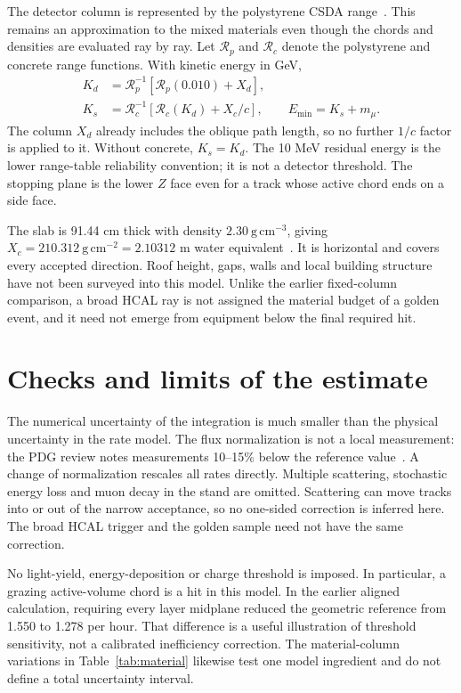 The detector column is represented by the polystyrene CSDA range~\cite{poly}.
This remains an approximation to the mixed materials even though the chords
and densities are evaluated ray by ray. Let $\mathcal R_p$ and
$\mathcal R_c$ denote the polystyrene and concrete range functions. With
kinetic energy in GeV,
\begin{align}
 K_d&=\mathcal R_p^{-1}[\mathcal R_p(0.010)+X_d],\\
 K_s&=\mathcal R_c^{-1}[\mathcal R_c(K_d)+X_c/c],\qquad
 E_{\min}=K_s+m_\mu .
\end{align}
The column $X_d$ already includes the oblique path length, so no further
$1/c$ factor is applied to it. Without concrete, $K_s=K_d$. The 10 MeV
residual energy is the lower range-table reliability convention; it is not
a detector threshold. The stopping plane is the lower $Z$ face even for a
track whose active chord ends on a side face.

The slab is 91.44 cm thick with density $2.30\ \mathrm{g\,cm^{-3}}$,
giving $X_c=210.312\ \mathrm{g\,cm^{-2}}=2.10312$ m water equivalent~\cite{concrete}.
It is horizontal and covers every accepted direction. Roof height, gaps,
walls and local building structure have not been surveyed into this model.
Unlike the earlier fixed-column comparison, a broad HCAL ray is not assigned
the material budget of a golden event, and it need not emerge from equipment
below the final required hit.

\section{Checks and limits of the estimate}
\label{sec:checks}




The numerical uncertainty of the integration is much smaller than the
physical uncertainty in the rate model. The flux normalization is not a local
measurement: the PDG review notes measurements 10--15\% below the reference
value~\cite{pdg}. A change of normalization rescales all rates directly.
Multiple scattering, stochastic energy loss and muon decay in the stand are
omitted. Scattering can move tracks into or out of the narrow acceptance,
so no one-sided correction is inferred here. The broad HCAL trigger and
the golden sample need not have the same correction.

No light-yield, energy-deposition or charge threshold is imposed. In particular,
a grazing active-volume chord is a hit in this model. In the earlier aligned
calculation, requiring every layer midplane reduced the geometric reference
from 1.550 to 1.278 per hour. That difference is a useful illustration of
threshold sensitivity, not a calibrated inefficiency correction. The
material-column variations in Table~\ref{tab:material} likewise test one
model ingredient and do not define a total uncertainty interval.

